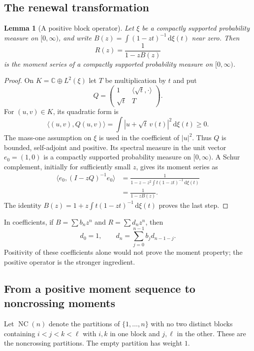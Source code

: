 \documentclass[11pt]{article}
\numberwithin{equation}{section}
\newtheorem{lemma}[theorem]{Lemma}
\theoremstyle{definition}
\theoremstyle{remark}
\newcommand{\C}{\mathbb C}
\newcommand{\dd}{\,\mathrm d}
\newcommand{\NC}{\operatorname{NC}}
\begin{document}
\subsection{The renewal transformation}
\begin{lemma}[A positive block operator]\label{gml:lem:renewal}
Let $\xi$ be a compactly supported probability measure on $[0,\infty)$,
and write $B(z)=\int(1-zt)^{-1}\dd\xi(t)$ near zero. Then
\begin{equation}\label{gml:eq:renewal}
 R(z)=\frac1{1-zB(z)}
\end{equation}
is the moment series of a compactly supported probability measure on
$[0,\infty)$.
\end{lemma}
\begin{proof}
On $K=\C\oplus L^2(\xi)$ let $T$ be multiplication by $t$ and put
\[
 Q=\begin{pmatrix}1&\langle\sqrt t,\cdot\rangle\\
                     \sqrt t&T\end{pmatrix}.
\]
For $(u,v)\in K$, its quadratic form is
\[
 \langle (u,v),Q(u,v)\rangle
   =\int|u+\sqrt t\,v(t)|^2\dd\xi(t)\ge0.
\]
The mass-one assumption on $\xi$ is used in the coefficient of $|u|^2$.
Thus $Q$ is bounded, self-adjoint and positive. Its spectral measure in
the unit vector $e_0=(1,0)$ is a compactly supported probability measure
on $[0,\infty)$. A Schur complement, initially for sufficiently small $z$,
gives its moment series as
\begin{align*}
 \langle e_0,(I-zQ)^{-1}e_0\rangle
 &=\frac1{1-z-z^2\int t(1-zt)^{-1}\dd\xi(t)}\\
 &=\frac1{1-zB(z)}.
\end{align*}
The identity $B(z)=1+z\int t(1-zt)^{-1}\dd\xi(t)$ proves the last step.
\end{proof}

In coefficients, if $B=\sum b_nz^n$ and $R=\sum d_nz^n$, then
\begin{equation}\label{gml:eq:renewalrec}
 d_0=1,\qquad d_n=\sum_{j=0}^{n-1}b_jd_{n-1-j}.
\end{equation}
Positivity of these coefficients alone would not prove the moment property;
the positive operator is the stronger ingredient.

\subsection{From a positive moment sequence to noncrossing moments}
Let $\NC(n)$ denote the partitions of $\{1,\ldots,n\}$ with no two distinct
blocks containing $i<j<k<\ell$ with $i,k$ in one block and $j,\ell$ in the
other. These are the noncrossing partitions. The empty partition has weight $1$.
\end{document}
